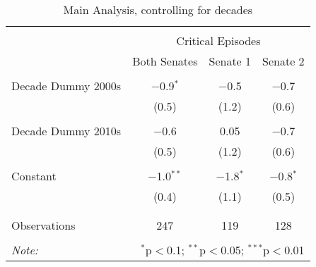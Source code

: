 
\begin{table}[!htbp] \centering 
  \caption{Main Analysis, controlling for decades} 
  \label{} 
\begin{tabular}{@{\extracolsep{5pt}}lccc} 
\\[-1.8ex]\hline 
\hline \\[-1.8ex] 
 & \multicolumn{3}{c}{Critical Episodes} \\ 
\cline{2-4} 
 & Both Senates & Senate 1 & Senate 2 \\ 
\hline \\[-1.8ex] 
 Decade Dummy 2000s & $-$0.9$^{*}$ & $-$0.5 & $-$0.7 \\ 
  & (0.5) & (1.2) & (0.6) \\ 
  & & & \\ 
 Decade Dummy 2010s & $-$0.6 & 0.05 & $-$0.7 \\ 
  & (0.5) & (1.2) & (0.6) \\ 
  & & & \\ 
 Constant & $-$1.0$^{**}$ & $-$1.8$^{*}$ & $-$0.8$^{*}$ \\ 
  & (0.4) & (1.1) & (0.5) \\ 
  & & & \\ 
\hline \\[-1.8ex] 
Observations & 247 & 119 & 128 \\ 
\hline 
\hline \\[-1.8ex] 
\textit{Note:}  & \multicolumn{3}{r}{$^{*}$p$<$0.1; $^{**}$p$<$0.05; $^{***}$p$<$0.01} \\ 
\end{tabular} 
\end{table} 
